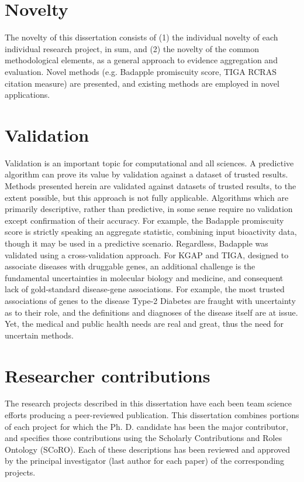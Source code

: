 \section{Novelty}

The novelty of this dissertation consists of (1) the individual novelty of each individual research project, in sum, and (2) the novelty of the common methodological elements, as a general approach to evidence aggregation and evaluation. Novel methods (e.g. Badapple promiscuity score, TIGA RCRAS citation measure) are presented, and existing methods are employed in novel applications.

\section{Validation}

Validation is an important topic for computational and all sciences. A predictive algorithm can prove its value by validation against a dataset of trusted results. Methods presented herein are validated against datasets of trusted results, to the extent possible, but this approach is not fully applicable. Algorithms which are primarily descriptive, rather than predictive, in some sense require no validation except confirmation of their accuracy. For example, the Badapple promiscuity score is strictly speaking an aggregate statistic, combining input bioactivity data, though it may be used in a predictive scenario. Regardless, Badapple was validated using a cross-validation approach. For KGAP and TIGA, designed to associate diseases with druggable genes, an additional challenge is the fundamental uncertainties in molecular biology and medicine, and consequent lack of gold-standard disease-gene associations. For example, the most trusted associations of genes to the disease Type-2 Diabetes are fraught with uncertainty as to their role, and the definitions and diagnoses of the disease itself are at issue. Yet, the medical and public health needs are real and great, thus the need for uncertain methods. 

\section{Researcher contributions}

The research projects described in this dissertation have each been team science efforts producing a peer-reviewed publication. This dissertation combines portions of each project for which the Ph. D. candidate has been the major contributor, and specifies those contributions using the Scholarly Contributions and Roles Ontology (SCoRO)\cite{Shotton2020-ph}. Each of these descriptions has been reviewed and approved by the principal investigator (last author for each paper) of the corresponding projects. 
